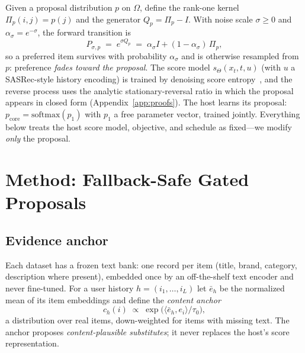 \documentclass[letterpaper]{article}
\newcommand{\pcore}{p_{\mathrm{core}}}
\newcommand{\ch}{c_{h}}
\begin{document}
Given a proposal distribution $p$ on $\Omega$, define the rank-one
kernel $\Pi_p(i,j)=p(j)$ and the generator $Q_p=\Pi_p-I$. With noise
scale $\sigma\ge 0$ and $\alpha_\sigma=e^{-\sigma}$, the forward
transition is
\begin{equation}
  P_{\sigma,p} \;=\; e^{\sigma Q_p} \;=\; \alpha_\sigma I +
  (1-\alpha_\sigma)\,\Pi_p ,
  \label{eq:forward}
\end{equation}
so a preferred item survives with probability $\alpha_\sigma$ and is
otherwise resampled from $p$: preference \emph{fades toward the
proposal}. The score model $s_\Theta(x_t,t,u)$ (with $u$ a SASRec-style
history encoding) is trained by denoising score entropy~\cite{sedd},
and the reverse process uses the analytic stationary-reversal ratio in
which the proposal appears in closed form (Appendix~\ref{app:proofs}).
The host learns its proposal: $\pcore=\mathrm{softmax}(p_1)$ with $p_1$
a free parameter vector, trained jointly. Everything below treats the
host score model, objective, and schedule as fixed---we modify
\emph{only} the proposal.

\section{Method: Fallback-Safe Gated Proposals}
\label{sec:method}

\subsection{Evidence anchor}
Each dataset has a frozen text bank: one record per item (title, brand,
category, description where present), embedded once by an off-the-shelf
text encoder and never fine-tuned. For a user history
$h=(i_1,\dots,i_L)$ let $\bar e_h$ be the normalized mean of its item
embeddings and define the \emph{content anchor}
\begin{equation}
  \ch(i) \;\propto\; \exp\!\big(\langle \bar e_h, e_i\rangle/\tau_0\big),
  \label{eq:anchor}
\end{equation}
a distribution over real items, down-weighted for items with missing
text. The anchor proposes \emph{content-plausible substitutes}; it
never replaces the host's score representation.
\end{document}
